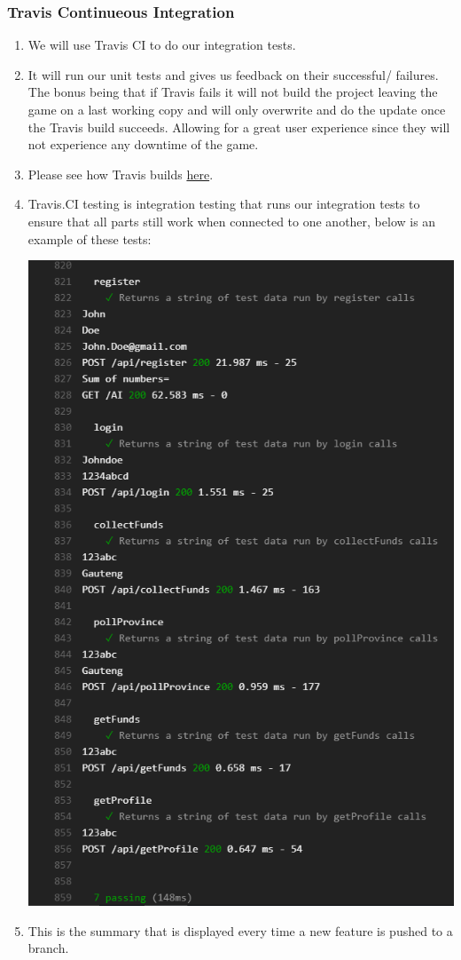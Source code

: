 \documentclass{article}
\begin{document}
		\subsubsection{Travis Continueous Integration}
			\begin{enumerate}
				\item We will use Travis CI to do our integration tests.  
				\item It will run our unit tests and gives us feedback on their successful/ failures. The bonus being that if Travis fails it will not build the project leaving the game on a last working copy and will only overwrite and do the update once the Travis build succeeds. Allowing for a great user experience since they will not experience any downtime of the game. 
				\item Please see how Travis builds \href{https://travis-ci.org/KobusMarais/Cerebero/}{here}.
                
                \item Travis.CI testing is integration testing that runs our integration tests to ensure that all parts still work when connected to one another, below is an example of these tests: \\
                
				\begin{center}
			        \includegraphics[width=0.55\linewidth]{Images/TravisCI_1.png}
			    \end{center}
			    
			    \item This is the summary that is displayed every time a new feature is pushed to a branch.
			    

\end{enumerate}
\end{document}
